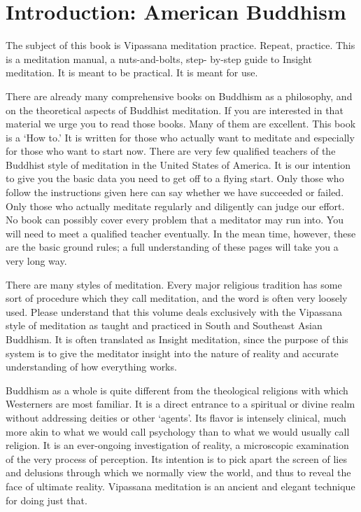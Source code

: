\chapter{Introduction: American Buddhism}

The subject of this book is Vipassana meditation practice. Repeat, practice.
This is a meditation manual, a nuts-and-bolts, step- by-step guide to Insight
meditation. It is meant to be practical. It is meant for use.

There are already many comprehensive books on Buddhism as a philosophy, and on
the theoretical aspects of Buddhist meditation. If you are interested in that
material we urge you to read those books. Many of them are excellent. This book
is a `How to.' It is written for those who actually want to meditate and
especially for those who want to start now. There are very few qualified
teachers of the Buddhist style of meditation in the United States of America. It
is our intention to give you the basic data you need to get off to a flying
start. Only those who follow the instructions given here can say whether we have
succeeded or failed. Only those who actually meditate regularly and diligently
can judge our effort. No book can possibly cover every problem that a meditator
may run into. You will need to meet a qualified teacher eventually. In the mean
time, however, these are the basic ground rules; a full understanding of these
pages will take you a very long way.

There are many styles of meditation. Every major religious tradition has some
sort of procedure which they call meditation, and the word is often very loosely
used. Please understand that this volume deals exclusively with the Vipassana
style of meditation as taught and practiced in South and Southeast Asian
Buddhism. It is often translated as Insight meditation, since the purpose of
this system is to give the meditator insight into the nature of reality and
accurate understanding of how everything works.

Buddhism as a whole is quite different from the theological religions with which
Westerners are most familiar. It is a direct entrance to a spiritual or divine
realm without addressing deities or other `agents'. Its flavor is intensely
clinical, much more akin to what we would call psychology than to what we would
usually call religion. It is an ever-ongoing investigation of reality, a
microscopic examination of the very process of perception. Its intention is to
pick apart the screen of lies and delusions through which we normally view the
world, and thus to reveal the face of ultimate reality. Vipassana meditation is
an ancient and elegant technique for doing just that.

